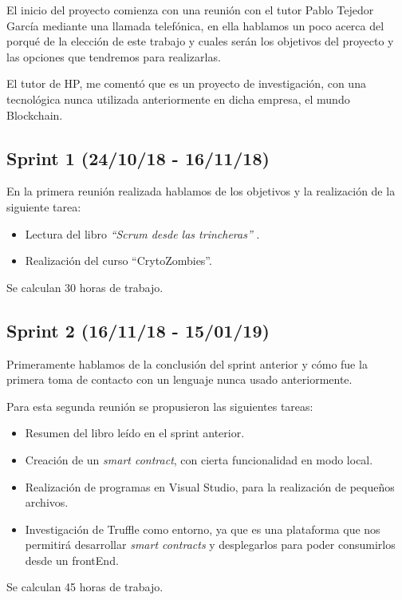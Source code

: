 El inicio del proyecto comienza con una reunión con el tutor Pablo Tejedor García mediante una llamada telefónica, en ella hablamos un poco acerca del porqué de la elección de este trabajo y cuales serán los objetivos del proyecto y las opciones que tendremos para realizarlas. 

El tutor de HP, me comentó que es un proyecto de investigación,  con una tecnológica nunca utilizada anteriormente en dicha empresa, el mundo Blockchain.


\subsection{Sprint 1 (24/10/18 - 16/11/18)}

En la primera reunión realizada hablamos de los objetivos y la realización de la siguiente tarea:

\begin{itemize}
	\item Lectura del libro \textit{``Scrum desde las trincheras''} \cite{libro}.
	\item Realización del curso ``CrytoZombies''.
\end{itemize}

Se calculan 30 horas de trabajo.

\subsection{Sprint 2 (16/11/18 - 15/01/19)}

Primeramente hablamos de la conclusión del sprint anterior y cómo fue la primera toma de contacto con un lenguaje nunca usado anteriormente.

Para esta segunda reunión se propusieron las siguientes tareas:
\begin{itemize}
	\item Resumen del libro leído en el sprint anterior.
	\item Creación de un \textit{smart contract}, con cierta funcionalidad en modo local.
	\item Realización de programas en Visual Studio, para la realización de pequeños archivos.
	\item Investigación de Truffle como entorno, ya que es una plataforma que nos permitirá desarrollar \textit{smart contracts} y desplegarlos para poder consumirlos desde un frontEnd.
\end{itemize}

Se calculan 45 horas de trabajo.

